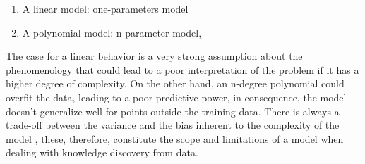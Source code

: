 \begin{enumerate}
    \item A linear model: one-parameters model
    \item A polynomial model: n-parameter model,
\end{enumerate}

The case for a linear behavior is a very strong assumption about the phenomenology that could lead to a poor interpretation of the problem if it has a higher degree of complexity. On the other hand, an n-degree polynomial could overfit the data, leading to a poor predictive power, in consequence, the model doesn't generalize well for points outside the training data. There is always a trade-off between the variance and the bias inherent to the complexity of the model \cite{Hastie2009}, these, therefore, constitute the scope and limitations of a model when dealing with knowledge discovery from data.
